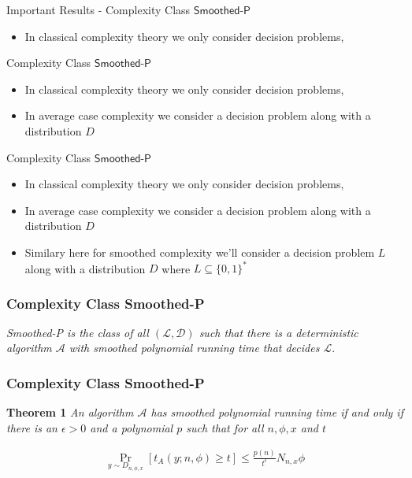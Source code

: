 \begin{frame}{Important Results - Complexity Class $\textsf{Smoothed-P}$}
    \begin{itemize}
        \item In classical complexity theory we only consider decision problems,
    \end{itemize}
\end{frame}

\begin{frame}{Complexity Class $\textsf{Smoothed-P}$}
    \begin{itemize}
        \item In classical complexity theory we only consider decision problems,
        \item In average case complexity we consider a decision problem along with a distribution $D$
    \end{itemize}
\end{frame}

\begin{frame}{Complexity Class $\textsf{Smoothed-P}$}
    \begin{itemize}
        \item In classical complexity theory we only consider decision problems,
        \item In average case complexity we consider a decision problem along with a
            distribution $D$
        \item Similary here for smoothed complexity we'll consider a decision problem $L$
            along with a distribution $D$ where $L \subseteq \{0,1\}^{*}$
    \end{itemize}
\end{frame}

\begin{frame}
    \frametitle{Complexity Class \textsf{Smoothed-P}}

    \begin{center}
        \textit{\textsf{Smoothed-P} is the class of all $ (\mathcal{L}, \mathcal{D})$ such that there is a
            deterministic algorithm $\mathcal{A}$ with smoothed polynomial running time that decides $\mathcal{L}$}.
    \end{center}

\end{frame}

\begin{frame}
    \frametitle{Complexity Class \textsf{Smoothed-P}}

    \textbf{Theorem 1} \textit{An algorithm $\mathcal{A}$ has smoothed polynomial running time if and only if
        there is an $\epsilon > 0$ and a polynomial $p$ such that for all $n, \phi, x$ and $t$}

    \begin{align*}
        \Pr_{y \sim D_{n, \phi, x}}[t_A(y;n, \phi) \geq t] \leq \frac{p(n)}{t^{\epsilon}} N_{n,x} \phi
    \end{align*}

\end{frame}

